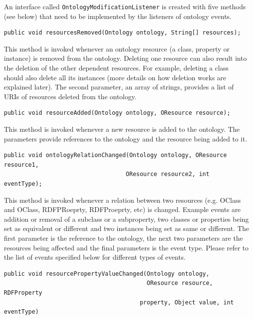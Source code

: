 An interface called \texttt{OntologyModificationListener} is created with five methods
(see below) that need to be implemented by the listeners of ontology events.
\begin{small}\begin{verbatim}
public void resourcesRemoved(Ontology ontology, String[] resources);
\end{verbatim}\end{small}
This method is invoked whenever an ontology resource (a class, property
or instance) is removed from the ontology. Deleting one resource can also
result into the deletion of the other dependent resources. For example, deleting a
class should also delete all its instances (more details on how deletion works
are explained later). The second parameter, an array of strings, provides a list
of URIs of resources deleted from the ontology.
\begin{small}\begin{verbatim}
public void resourceAdded(Ontology ontology, OResource resource);
\end{verbatim}\end{small}
This method is invoked whenever a new resource is added to the ontology. The
parameters provide references to the ontology and the resource being added to it.
\begin{small}\begin{verbatim}
public void ontologyRelationChanged(Ontology ontology, OResource resource1, 
                                   OResource resource2, int eventType);
\end{verbatim}\end{small}
This method is invoked whenever a relation between two resources (e.g. OClass and 
OClass, RDFPRoeprty, RDFProeprty, etc) is changed. Example events are addition
or removal of a subclass or a subproperty, two classes or properties being set as
equivalent or different and two instances being set as same or different. The first parameter
is the reference to the ontology, the next two parameters are the resources being affected and
the final parameters is the event type. Please refer to the list of events specified below for
different types of events.
\begin{small}\begin{verbatim}
public void resourcePropertyValueChanged(Ontology ontology, 
                                         OResource resource, RDFProperty
                                       property, Object value, int eventType)
\end{verbatim}\end{small}

